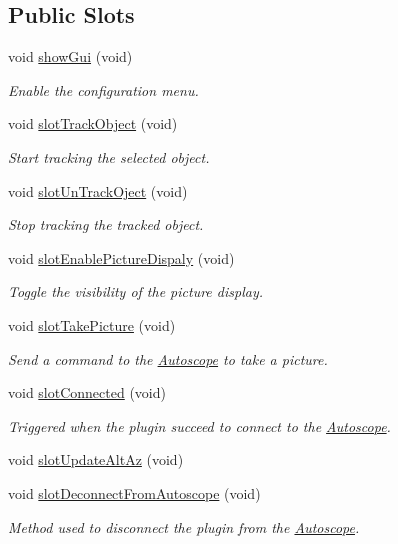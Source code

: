 \subsection*{Public Slots}
\begin{DoxyCompactItemize}
\item 
void \hyperlink{class_autoscope_a2a3fc7df788580d91949351f687eab7a}{show\+Gui} (void)
\begin{DoxyCompactList}\small\item\em Enable the configuration menu. \end{DoxyCompactList}\item 
void \hyperlink{class_autoscope_ae0c39815fab1084effd39f87e56febf3}{slot\+Track\+Object} (void)
\begin{DoxyCompactList}\small\item\em Start tracking the selected object. \end{DoxyCompactList}\item 
void \hyperlink{class_autoscope_a47d7fbe1a8bcf025ef57b45ead2bcf6e}{slot\+Un\+Track\+Oject} (void)
\begin{DoxyCompactList}\small\item\em Stop tracking the tracked object. \end{DoxyCompactList}\item 
void \hyperlink{class_autoscope_a9216c1ee654d8da28d331b3020b6e27d}{slot\+Enable\+Picture\+Dispaly} (void)
\begin{DoxyCompactList}\small\item\em Toggle the visibility of the picture display. \end{DoxyCompactList}\item 
void \hyperlink{class_autoscope_a55c4956c3a71198b70cf19fea503a776}{slot\+Take\+Picture} (void)
\begin{DoxyCompactList}\small\item\em Send a command to the \hyperlink{class_autoscope}{Autoscope} to take a picture. \end{DoxyCompactList}\item 
void \hyperlink{class_autoscope_ae85d6642b5db861e226a6a261c5c0a37}{slot\+Connected} (void)
\begin{DoxyCompactList}\small\item\em Triggered when the plugin succeed to connect to the \hyperlink{class_autoscope}{Autoscope}. \end{DoxyCompactList}\item 
void \hyperlink{class_autoscope_a7d51e9915c4618d8ee5dd78e5ca079c5}{slot\+Update\+Alt\+Az} (void)
\item 
void \hyperlink{class_autoscope_a191c9746ccdf08bc804150452792b7eb}{slot\+Deconnect\+From\+Autoscope} (void)
\begin{DoxyCompactList}\small\item\em Method used to disconnect the plugin from the \hyperlink{class_autoscope}{Autoscope}. \end{DoxyCompactList}\end{DoxyCompactItemize}
